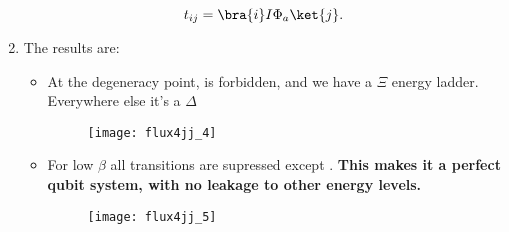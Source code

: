\begin{enumerate}
\begin{framed}
  \begin{equation}
    t_{ij} = \bra{i}I\Phi_a\ket{j}.
  \end{equation}
\end{framed}

\item The results are:
  \begin{itemize}
  \item At  the degeneracy  point, \ilra{}  is forbidden,
    and we have a $ \Xi $ energy ladder.  Everywhere else it's a $ \Delta $
    \begin{figure}[h]
      \centering \texttt{[image: flux4jj\_4]}
    \end{figure}

    \noindent
  \item  For   low  $  \beta   $  all  transitions  are   supressed  except
    \ilra{}.   \textbf{This  makes  it  a  perfect  qubit
      system, with no leakage to other energy levels.}

    \begin{figure}[h]
      \centering \texttt{[image: flux4jj\_5]}
    \end{figure}

  \end{itemize}
\end{enumerate}
